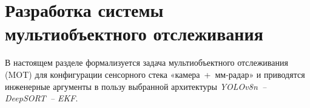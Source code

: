 \chapter{Разработка системы мультиобъектного отслеживания}

В настоящем разделе формализуется задача мультиобъектного отслеживания (MOT)
для конфигурации сенсорного стека «камера + мм-радар» и приводятся инженерные  аргументы в пользу выбранной архитектуры \textit{YOLOv8n -- DeepSORT -- EKF}.






